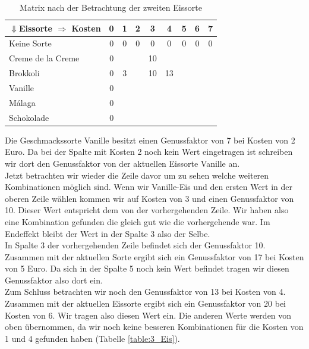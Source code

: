 \documentclass[a4paper, 12pt]{article}
\begin{document}
\begin{table}[H]
	\begin{center}
		\begin{tabular}{l|cccccccc}
			$\Downarrow$Eissorte $\Rightarrow$ Kosten & 0 & 1 & 2 & 3 & 4 & 5 &
			6 & 7\\
			\hline
			Keine Sorte			& 0 & 0 & 0 & 0	 &	0 & 0	& 0 & 0 \\
			Creme de la Creme	& 0 &	&	& 10 &	  & &	&	\\
			Brokkoli			& 0 & 3 &	& 10 & 13 & &	&	\\
			Vanille				& 0 &	&	&	 &	  & &	&	\\
			Málaga				& 0 &	&	&	 &	  & &	&	\\
			Schokolade			& 0 &	&	&	 &	  & &	&	\\
		\end{tabular}
	\end{center}
\caption{Matrix nach der Betrachtung der zweiten Eissorte}
\label{table:2_Eis}
\end{table}

Die Geschmackssorte Vanille besitzt einen Genussfaktor von 7 bei Kosten von 2 Euro. Da bei der Spalte mit Kosten 2 noch kein Wert eingetragen ist schreiben wir dort den Genussfaktor von der aktuellen Eissorte Vanille an.\\

Jetzt betrachten wir wieder die Zeile davor um zu sehen welche weiteren Kombinationen möglich sind. Wenn wir Vanille-Eis und den ersten Wert in der oberen Zeile wählen kommen wir auf Kosten von 3 und einen Genussfaktor von 10. Dieser Wert entspricht dem von der vorhergehenden Zeile. Wir haben also eine Kombination gefunden die gleich gut wie die vorhergehende war. Im Endeffekt bleibt der Wert in der Spalte 3 also der Selbe.\\

In Spalte 3 der vorhergehenden Zeile befindet sich der Genussfaktor 10. Zusammen mit der aktuellen Sorte ergibt sich ein Genussfaktor von 17 bei Kosten von 5 Euro. Da sich in der Spalte 5 noch kein Wert befindet tragen wir diesen Genussfaktor also dort ein.\\ 

Zum Schluss betrachten wir noch den Genussfaktor von 13 bei Kosten von 4. Zusammen mit der aktuellen Eissorte ergibt sich ein Genussfaktor von 20 bei Kosten von 6. Wir tragen also diesen Wert ein. Die anderen Werte werden von oben übernommen, da wir noch keine besseren Kombinationen für die Kosten von 1 und 4 gefunden haben (Tabelle \ref{table:3_Eis}).
\end{document}

